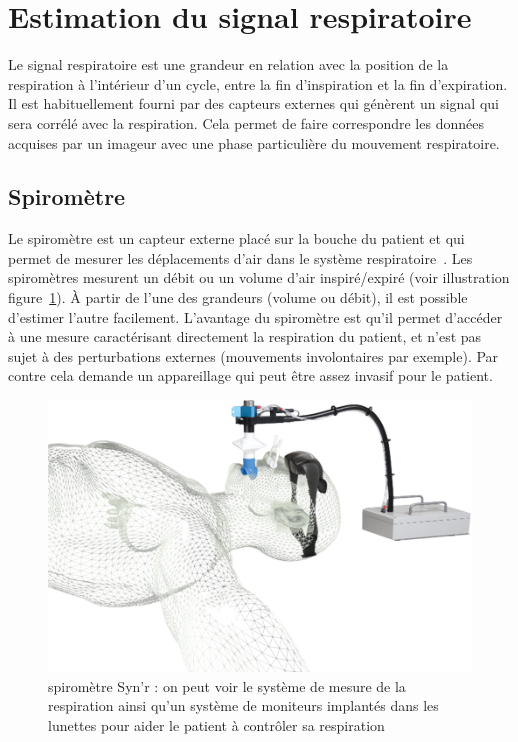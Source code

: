 \section{Estimation du signal respiratoire}

Le signal respiratoire est une grandeur en relation avec la position de la respiration à l'intérieur d'un cycle, entre la fin d'inspiration et la fin d'expiration. Il est habituellement fourni par des capteurs externes qui génèrent un signal qui sera corrélé avec la respiration. Cela permet de faire correspondre les données acquises par un imageur avec une phase particulière du mouvement respiratoire.

\subsection{Spiromètre}
\label{lab:spirometre}
Le spiromètre est un capteur externe placé sur la bouche du patient et qui permet de mesurer les déplacements d'air dans le système respiratoire~\cite{guivarc2004synchronization}. Les spiromètres mesurent un débit ou un volume d'air inspiré/expiré (voir illustration figure~\ref{fig:spirometre}). \`A partir de l'une des grandeurs (volume ou débit), il est possible d'estimer l'autre facilement. L'avantage du spiromètre est qu'il permet d'accéder à une mesure caractérisant directement la respiration du patient, et n'est pas sujet à des perturbations externes (mouvements involontaires par exemple). Par contre cela demande un appareillage qui peut être assez invasif pour le patient.

\begin{figure}[h!]
	\begin{center}
		\includegraphics[width=12cm]{images/spiro}
	\end{center}
	\caption{spiromètre Syn'r : on peut voir le système de mesure de la respiration ainsi qu'un système de moniteurs implantés dans les lunettes pour aider le patient à contrôler sa respiration} 
	\label{fig:spirometre}
\end{figure}

